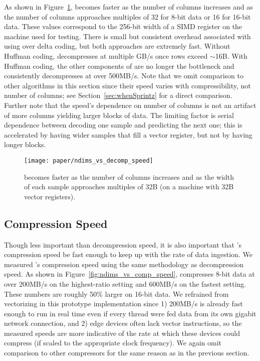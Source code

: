 As shown in Figure~\ref{fig:ndims_vs_decomp_speed}, \minesp becomes faster as the number of columns increases and as the number of columns approaches multiples of 32 for 8-bit data or 16 for 16-bit data. These values correspond to the 256-bit width of a SIMD register on the machine used for testing. There is small but consistent overhead associated with using \fire over delta coding, but both approaches are extremely fast. Without Huffman coding, \minesp decompresses at multiple GB/s once rows exceed $\sim$16B. With Huffman coding, the other components of \minesp are no longer the bottleneck and \minesp consistently decompresses at over 500MB/s. Note that we omit comparison to other algorithms in this section since their speed varies with compressibility, not number of columns; see Section~\ref{sec:whenSprintz} for a direct comparison. Further note that the speed's dependence on number of columns is not an artifact of more columns yielding larger blocks of data. The limiting factor is serial dependence between decoding one sample and predicting the next one; this is accelerated by having wider samples that fill a vector register, but not by having longer blocks.

\begin{figure}[h]
\begin{center}
    \texttt{[image: paper/ndims\_vs\_decomp\_speed]}
    \caption{\minesp becomes faster as the number of columns increases and as the width of each sample approaches multiples of 32B (on a machine with 32B vector registers). }
    \label{fig:ndims_vs_decomp_speed}
\end{center}
\end{figure}


\subsection{Compression Speed} \label{sec:comp_speed}

Though less important than decompression speed, it is also important that \mine's compression speed be fast enough to keep up with the rate of data ingestion. We measured \mine's compression speed using the same methodology as decompression speed. As shown in Figure~\ref{fig:ndims_vs_comp_speed}, \mine \text{} compresses 8-bit data at over 200MB/s on the highest-ratio setting and 600MB/s on the fastest setting. These numbers are roughly 50\% larger on 16-bit data. We refrained from vectorizing in this prototype implementation since 1) 200MB/s is already fast enough to run in real time even if every thread were fed data from its own gigabit network connection, and 2) edge devices often lack vector instructions, so the measured speeds are more indicative of the rate at which these devices could compress (if scaled to the appropriate clock frequency). We again omit comparison to other compressors for the same reason as in the previous section.

